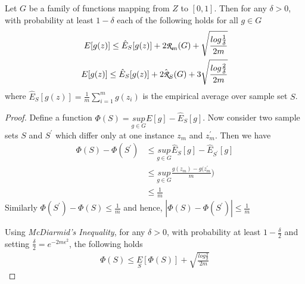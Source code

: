 \documentclass[../toml]{subfiles}
\begin{document}
\begin{theorem} \label{th:rademacher_complexity}
Let $G$ be a family of functions mapping from $Z$ to $[0,1]$. Then for any $\delta>0$,
with probability at least $1-\delta$ each of the following holds for all $g \in G$
\begin{align}
E[g(z)] \leq \hat{E}_S[g(z)] + 2\cursive{R}_m(G) + \sqrt{\frac{log\frac{1}{\delta}}{2m}} \label{eq:th:rademacher_1} \\
E[g(z)] \leq \hat{E}_S[g(z)] + 2\hat{\cursive{R}}_S(G) + 3\sqrt{\frac{log\frac{2}{\delta}}{2m}} \label{eq:th:rademacher_2}
\end{align}
where $\hat{E}_S[g(z)] = \frac{1}{m} \sum_{i=1}^{m} g(z_i)$ is the empirical average over
sample set $S$.
\end{theorem}
\begin{proof}
Define a function $\Phi(S) = \underset{g \in G}{sup} E[g] - \hat{E}_S[g]$. Now consider
two sample sets $S$ and $S^\prime$ which differ only at one instance $z_m$ and $z_m^
\prime$. Then we have
\begin{align}
\Phi(S) - \Phi(S^\prime) &\leq \underset{g \in G}{sup} \hat{E}_S[g] - \hat{E}_{S^\prime}[g] \nonumber \\
&\leq \underset{g \in G}{sup} \frac{g(z_m) - g(z_m^\prime}{m}) \nonumber \\
&\leq \frac{1}{m}
\end{align}
Similarly $\Phi(S^\prime) - \Phi(S) \leq \frac{1}{m}$ and hence, $\left| \Phi(S) - \Phi(S^\prime)\right| \leq \frac{1}{m}$

Using \textit{McDiarmid's Inequality}, for any $\delta > 0$, with probability at least
$1-\frac{\delta}{2}$ and setting $\frac{\delta}{2} = e^{-2m\epsilon^2}$, the following holds
\begin{align}
\Phi(S) \leq \underset{S}{E}[\Phi(S)] + \sqrt{\frac{log\frac{2}{\delta}}{2m}} \label{eq:ramemacher_proof_phi}
\end{align}


\end{proof}
\end{document}
